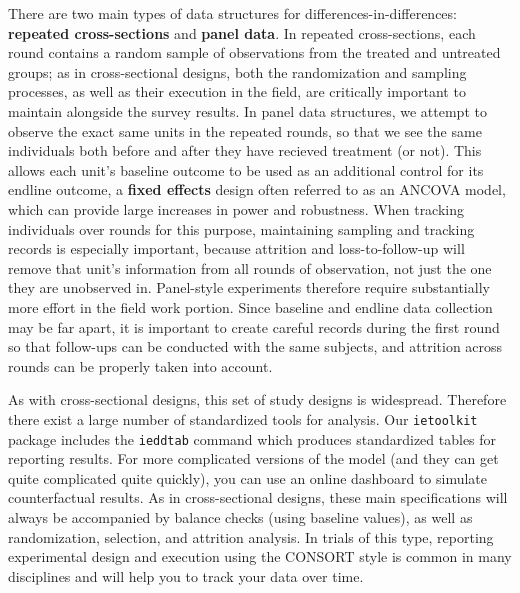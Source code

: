 There are two main types of data structures for differences-in-differences:
\textbf{repeated cross-sections} and \textbf{panel data}.
In repeated cross-sections, each round contains a random sample
of observations from the treated and untreated groups;
as in cross-sectional designs, both the randomization and sampling processes,
as well as their execution in the field,
are critically important to maintain alongside the survey results.
In panel data structures, we attempt to observe the exact same units
in the repeated rounds, so that we see the same individuals
both before and after they have recieved treatment (or not).
This allows each unit's baseline outcome to be used
as an additional control for its endline outcome,
a \textbf{fixed effects} design often referred to as an ANCOVA model,
which can provide large increases in power and robustness.
When tracking individuals over rounds for this purpose,
maintaining sampling and tracking records is especially important,
because attrition and loss-to-follow-up will remove that unit's information
from all rounds of observation, not just the one they are unobserved in.
Panel-style experiments therefore require substantially more effort
in the field work portion.
Since baseline and endline data collection may be far apart,
it is important to create careful records during the first round
so that follow-ups can be conducted with the same subjects,
and attrition across rounds can be properly taken into account.

As with cross-sectional designs, this set of study designs is widespread.
Therefore there exist a large number of standardized tools for analysis.
Our \texttt{ietoolkit} package includes the \texttt{ieddtab} command
which produces standardized tables for reporting results.
For more complicated versions of the model
(and they can get quite complicated quite quickly),
you can use an online dashboard to simulate counterfactual results.
As in cross-sectional designs, these main specifications
will always be accompanied by balance checks (using baseline values),
as well as randomization, selection, and attrition analysis.
In trials of this type, reporting experimental design and execution
using the CONSORT style is common in many disciplines
and will help you to track your data over time.\cite{schulz2010consort}

